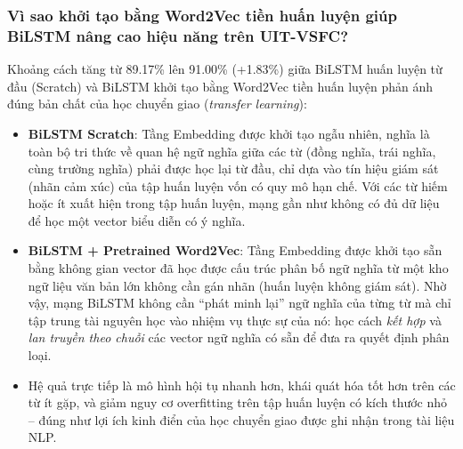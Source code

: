 \documentclass[12pt,a4paper]{article}
\begin{document}
\subsubsection{Vì sao khởi tạo bằng Word2Vec tiền huấn luyện giúp BiLSTM nâng cao hiệu năng trên UIT-VSFC?}\label{sec:discuss_pretrained_init}
Khoảng cách tăng từ 89.17\% lên 91.00\% (+1.83\%) giữa BiLSTM huấn luyện từ đầu (Scratch) và BiLSTM khởi tạo bằng Word2Vec tiền huấn luyện phản ánh đúng bản chất của học chuyển giao (\textit{transfer learning}):
\begin{itemize}[leftmargin=1.0cm, itemsep=2pt]
    \item[--] \textbf{BiLSTM Scratch}: Tầng Embedding được khởi tạo ngẫu nhiên, nghĩa là toàn bộ tri thức về quan hệ ngữ nghĩa giữa các từ (đồng nghĩa, trái nghĩa, cùng trường nghĩa) phải được học lại từ đầu, chỉ dựa vào tín hiệu giám sát (nhãn cảm xúc) của tập huấn luyện vốn có quy mô hạn chế. Với các từ hiếm hoặc ít xuất hiện trong tập huấn luyện, mạng gần như không có đủ dữ liệu để học một vector biểu diễn có ý nghĩa.
    \item[--] \textbf{BiLSTM + Pretrained Word2Vec}: Tầng Embedding được khởi tạo sẵn bằng không gian vector đã học được cấu trúc phân bố ngữ nghĩa từ một kho ngữ liệu văn bản lớn không cần gán nhãn (huấn luyện không giám sát). Nhờ vậy, mạng BiLSTM không cần ``phát minh lại'' ngữ nghĩa của từng từ mà chỉ tập trung tài nguyên học vào nhiệm vụ thực sự của nó: học cách \textit{kết hợp} và \textit{lan truyền theo chuỗi} các vector ngữ nghĩa có sẵn để đưa ra quyết định phân loại.
    \item[--] Hệ quả trực tiếp là mô hình hội tụ nhanh hơn, khái quát hóa tốt hơn trên các từ ít gặp, và giảm nguy cơ overfitting trên tập huấn luyện có kích thước nhỏ -- đúng như lợi ích kinh điển của học chuyển giao được ghi nhận trong tài liệu NLP.
\end{itemize}
\end{document}
